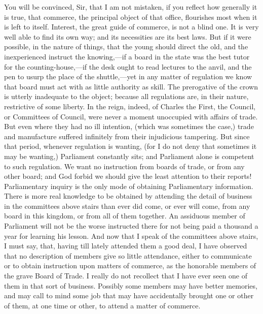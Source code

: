 You will be convinced, Sir, that I am not mistaken, if you reflect how generally it is true, that commerce, the principal object of that office, flourishes most when it is left to itself. Interest, the great guide of commerce, is not a blind one. It is very well able to find its own way; and its necessities are its best laws. But if it were possible, in the nature of things, that the young should direct the old, and the inexperienced instruct the knowing,—if a board in the state was the best tutor for the counting-house,—if the desk ought to read lectures to the anvil, and the pen to usurp the place of the shuttle,—yet in any matter of regulation we know that board must act with as little authority as skill. The prerogative of the crown is utterly inadequate to the object; because all regulations are, in their nature, restrictive of some liberty. In the reign, indeed, of Charles the First, the Council, or Committees of Council, were never a moment unoccupied with affairs of trade. But even where they had no ill intention, (which was sometimes the case,) trade and manufacture suffered infinitely from their injudicious tampering. But since that period, whenever regulation is wanting, (for I do not deny that sometimes it may be wanting,) Parliament constantly sits; and Parliament alone is competent to such regulation. We want no instruction from boards of trade, or from any other board; and God forbid we should give the least attention to their reports! Parliamentary inquiry is the only mode of obtaining Parliamentary information. There is more real knowledge to be obtained by attending the detail of business in the committees above stairs than ever did come, or ever will come, from any board in this kingdom, or from all of them together. An assiduous member of Parliament will not be the worse instructed there for not being paid a thousand a year for learning his lesson. And now that I speak of the committees above stairs, I must say, that, having till lately attended them a good deal, I have observed that no description of members give so little attendance, either to communicate or to obtain instruction upon matters of commerce, as the honorable members of the grave Board of Trade. I really do not recollect that I have ever seen one of them in that sort of business. Possibly some members may have better memories, and may call to mind some job that may have accidentally brought one or other of them, at one time or other, to attend a matter of commerce.

